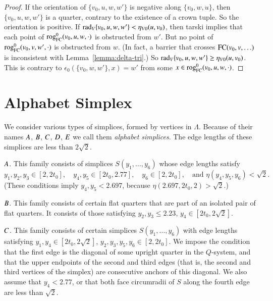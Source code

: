 \begin{proof}
If the orientation of $\{v_0,u,w,w'\}$ is negative along $\{v_0,w,u\}$,
then $\{v_0,u,w,w'\}$ is a quarter, 
contrary to the existence of a crown tuple.  
So the orientation is positive.  If $\operatorname{rad}_V\{v_0,u,w,w'\} <
\eta_{V0}(u,v_0)$, then tarski implies that each point
of ${\operatorname{rog}}^0_{\text{FC}}(v_0,u,w,\cdot)$ is obstructed from $w'$.  
But no point of ${\operatorname{rog}}^0_{\text{FC}}(v_0,v,w',\cdot)$ is
obstructed from $w$. (In fact, a barrier that crosses
${\operatorname{FC}}(v_0,v,\ldots)$ is inconsistent with Lemma~\ref{lemma:delta-tri}.)
So
$\operatorname{rad}_V\{v_0,u,w,w'\} \ge \eta_{V0}(u,v_0)$.  This is contrary to
$\epsilon_0(\{v_0,w,w'\},x) = w'$ from some $x\in {\operatorname{rog}}^0_{\text{FC}}(v_0,u,w,\cdot)$.
\end{proof}



\section{Alphabet Simplex}%

We consider various types of simplices, formed by vertices in $\Lambda$.  
Because of their names $A$, $B$, $C$, $D$, $E$ we call them
{\it alphabet simplices}.
  The edge lengths of
these simplices are less than $2\sqrt{2}$.

$A$.  This family consists of simplices $S(y_1,\ldots,y_6)$ whose
edge lengths satisfy
    $$
    y_1,y_2,y_3\in[2,2t_0],\quad
    y_4,y_5\in[2t_0,2.77],
    \quad
    y_6\in[2,2t_0],\quad \text{and }
    \eta(y_4,y_5,y_6)<\sqrt{2}.
    $$
(These conditions imply $y_4,y_5<2.697$, because
$\eta(2.697,2t_0,2)>\sqrt2$.)

$B$.  This family consists of certain flat quarters that are
part of an isolated pair of flat quarters. It consists of those
satisfying $y_2,y_3\le 2.23$, $y_4\in[2t_0,2\sqrt{2}]$.

$C$.  This family consists of certain simplices
$S(y_1,\ldots,y_6)$ with edge lengths satisfying
    $y_1,y_4\in[2t_0,2\sqrt{2}]$, $y_2,y_3,y_5,y_6\in[2,2t_0]$.
We impose the condition that the first edge is the diagonal of
some upright quarter in the $Q$-system, and that the upper
endpoints of the second and third edges (that is, the second and
third vertices of the simplex) are consecutive anchors of this
diagonal. We also assume that $y_4< 2.77$, or that both face
circumradii of $S$ along the fourth edge are less than $\sqrt{2}$.

